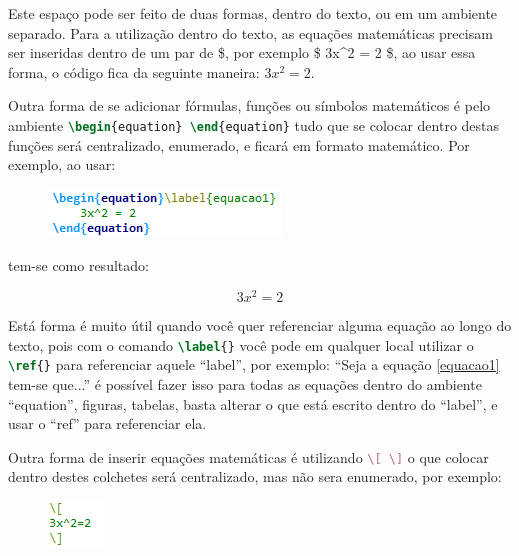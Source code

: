 Este espaço pode ser feito de duas formas, dentro do texto, ou em um ambiente separado. Para a utilização dentro do texto, as equações matemáticas precisam ser inseridas dentro de um par de \$, por exemplo \$ 3x\textasciicircum 2 = 2 \$, ao usar essa forma, o código fica da seguinte maneira: $3x^2=2$.

Outra forma de se adicionar fórmulas, funções ou símbolos matemáticos é pelo ambiente \lstinline[language=TeX]|\begin{equation} \end{equation}| tudo que se colocar dentro destas funções será centralizado, enumerado, e ficará em formato matemático. Por exemplo, ao usar:

\begin{figure}[htb]
	\begin{center}
		\includegraphics[scale=1]{./Imagens/capitulo_2/code_1.png}
	\end{center}
\end{figure}

tem-se como resultado:

\begin{equation}\label{equacao1}
	3x^2 = 2
\end{equation}

Está forma é muito útil quando você quer referenciar alguma equação ao longo do texto, pois com o comando \lstinline[language=TeX]|\label{}| você pode em qualquer local utilizar o \lstinline[language=TeX]|\ref{}| para referenciar aquele ``label'', por exemplo: ``Seja a equação \ref{equacao1} tem-se que...'' é possível fazer isso para todas as equações dentro do ambiente ``equation'', figuras, tabelas, basta alterar o que está escrito dentro do ``label'', e usar o ``ref'' para referenciar ela.

Outra forma de inserir equações matemáticas é utilizando \lstinline[language=TeX]|\[ \]| o que colocar dentro destes colchetes será centralizado, mas não sera enumerado, por exemplo:

\begin{figure}[htb]
	\begin{center}
		\includegraphics[scale=1.5]{./Imagens/capitulo_2/code_2.png}
	\end{center}
\end{figure}

